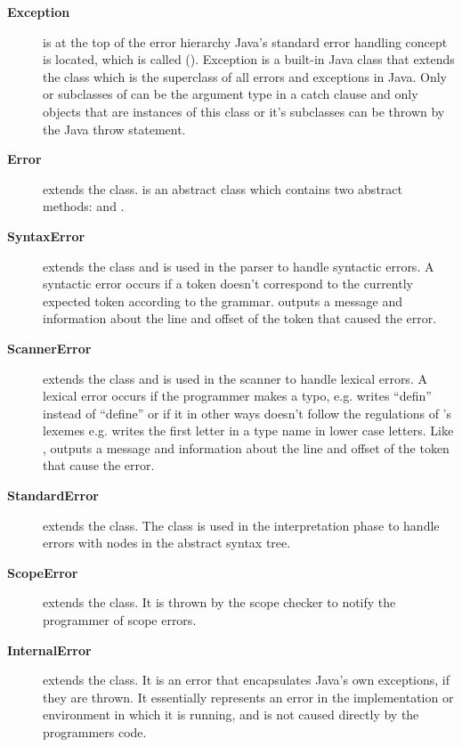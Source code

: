 \begin{description}
\item[\textbf{Exception}] is at the top of the error hierarchy Java's standard
  error handling concept is located, which is called 
  (). Exception is a built-in Java class that
  extends the  class which is the superclass of all errors
  and exceptions in Java. Only  or subclasses of
   can be the argument type in a catch clause and only
  objects that are instances of this class or it's subclasses can be thrown by
  the Java throw statement.
  \cite{throwable}

\item[\textbf{Error}] extends the  class. 
  is an abstract class which contains two abstract methods:
   and .

\item[\textbf{SyntaxError}] extends the  class and is used in
  the parser to handle syntactic errors. A syntactic error occurs if a token
  doesn't correspond to the currently expected token according to the grammar.
   outputs a message and information about the line and
  offset of the token that caused the error. 

\item[\textbf{ScannerError}] extends the  class and is
  used in the scanner to handle lexical errors. A lexical error occurs if the
  programmer makes a typo, e.g. writes ``defin'' instead of ``define'' or if it 
  in other ways doesn't follow the regulations of \productname{}'s lexemes e.g.
  writes the first letter in a type name in lower case letters. Like
  ,  outputs a message and
  information about the line and offset of the token that cause the error.  

\item[\textbf{StandardError}] extends the  class. The
   class is used in the interpretation phase to handle
  errors with nodes in the abstract syntax tree.  

\item[\textbf{ScopeError}] extends the  class. It is
  thrown by the scope checker to notify the programmer of scope errors.

\item[\textbf{InternalError}] extends the  class. It is
  an error that encapsulates Java's own exceptions, if they are thrown. It
  essentially represents an error in the implementation or environment in which
  it is running, and is not caused directly by the programmers code.


\end{description}
